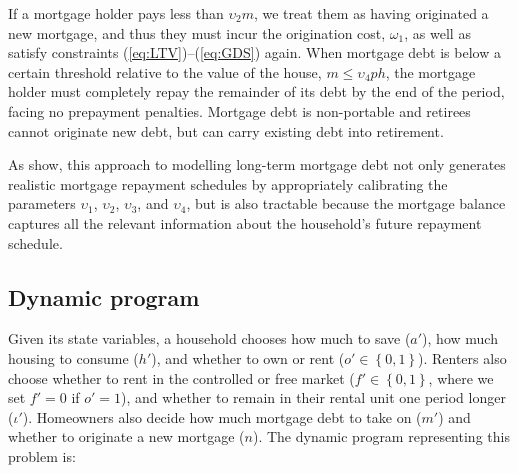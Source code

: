 \documentclass[parskip=full]{article}
\begin{document}
\noindent If a mortgage holder pays less than $\upsilon_{2}m$, we treat them as having originated a new mortgage, and thus they must incur the origination cost, $\omega_{1}$, as well as satisfy constraints (\ref{eq:LTV})--(\ref{eq:GDS}) again. When mortgage debt is below a certain threshold relative to the value of the house, $m \leq \upsilon_{4}ph$, the mortgage holder must completely repay the remainder of its debt by the end of the period, facing no prepayment penalties. Mortgage debt is non-portable and retirees cannot originate new debt, but can carry existing debt into retirement.

As \citet{rs-2023} show, this approach to modelling long-term mortgage debt not only generates realistic mortgage repayment schedules by appropriately calibrating the parameters $\upsilon_1$, $\upsilon_2$, $\upsilon_3$, and $\upsilon_4$, but is also tractable because the mortgage balance captures all the relevant information about the household's future repayment schedule.

\subsection{Dynamic program}\label{subsection:household_optimization}
Given its state variables, a household chooses how much to save ($a'$), how much housing to consume ($h'$), and whether to own or rent ($o' \in \left\{0,1\right\}$). Renters also choose whether to rent in the controlled or free market ($f' \in \left\{0,1\right\}$, where we set $f'=0$ if $o'=1$), and whether to remain in their rental unit one period longer ($\iota'$). Homeowners also decide how much mortgage debt to take on ($m'$) and whether to originate a new mortgage ($n$). The dynamic program representing this problem is:
\end{document}

